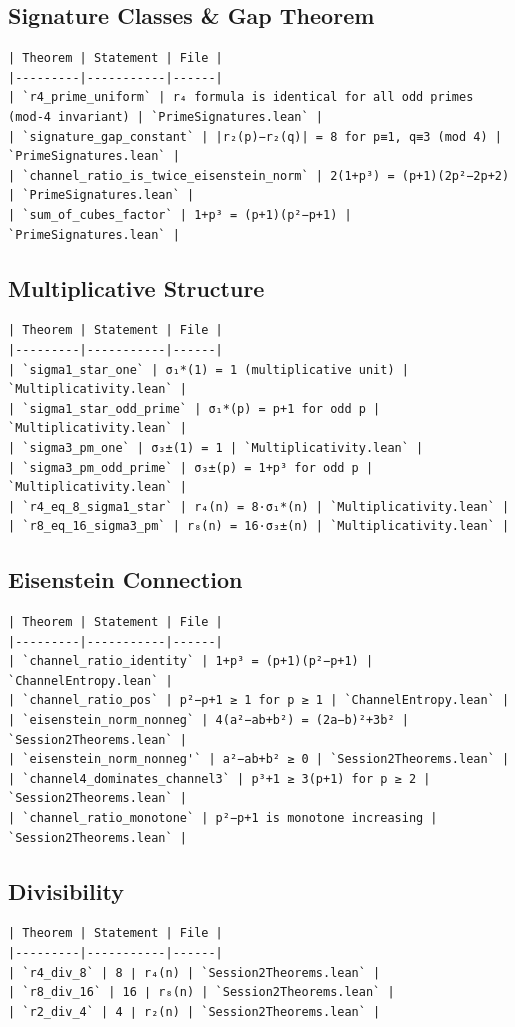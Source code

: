 \documentclass[12pt,a4paper,openany]{book}
\begin{document}
\subsection{Signature Classes \& Gap Theorem}
\begin{verbatim}
| Theorem | Statement | File |
|---------|-----------|------|
| `r4_prime_uniform` | r₄ formula is identical for all odd primes (mod-4 invariant) | `PrimeSignatures.lean` |
| `signature_gap_constant` | |r₂(p)−r₂(q)| = 8 for p≡1, q≡3 (mod 4) | `PrimeSignatures.lean` |
| `channel_ratio_is_twice_eisenstein_norm` | 2(1+p³) = (p+1)(2p²−2p+2) | `PrimeSignatures.lean` |
| `sum_of_cubes_factor` | 1+p³ = (p+1)(p²−p+1) | `PrimeSignatures.lean` |
\end{verbatim}

\subsection{Multiplicative Structure}
\begin{verbatim}
| Theorem | Statement | File |
|---------|-----------|------|
| `sigma1_star_one` | σ₁*(1) = 1 (multiplicative unit) | `Multiplicativity.lean` |
| `sigma1_star_odd_prime` | σ₁*(p) = p+1 for odd p | `Multiplicativity.lean` |
| `sigma3_pm_one` | σ₃±(1) = 1 | `Multiplicativity.lean` |
| `sigma3_pm_odd_prime` | σ₃±(p) = 1+p³ for odd p | `Multiplicativity.lean` |
| `r4_eq_8_sigma1_star` | r₄(n) = 8·σ₁*(n) | `Multiplicativity.lean` |
| `r8_eq_16_sigma3_pm` | r₈(n) = 16·σ₃±(n) | `Multiplicativity.lean` |
\end{verbatim}

\subsection{Eisenstein Connection}
\begin{verbatim}
| Theorem | Statement | File |
|---------|-----------|------|
| `channel_ratio_identity` | 1+p³ = (p+1)(p²−p+1) | `ChannelEntropy.lean` |
| `channel_ratio_pos` | p²−p+1 ≥ 1 for p ≥ 1 | `ChannelEntropy.lean` |
| `eisenstein_norm_nonneg` | 4(a²−ab+b²) = (2a−b)²+3b² | `Session2Theorems.lean` |
| `eisenstein_norm_nonneg'` | a²−ab+b² ≥ 0 | `Session2Theorems.lean` |
| `channel4_dominates_channel3` | p³+1 ≥ 3(p+1) for p ≥ 2 | `Session2Theorems.lean` |
| `channel_ratio_monotone` | p²−p+1 is monotone increasing | `Session2Theorems.lean` |
\end{verbatim}

\subsection{Divisibility}
\begin{verbatim}
| Theorem | Statement | File |
|---------|-----------|------|
| `r4_div_8` | 8 ∣ r₄(n) | `Session2Theorems.lean` |
| `r8_div_16` | 16 ∣ r₈(n) | `Session2Theorems.lean` |
| `r2_div_4` | 4 ∣ r₂(n) | `Session2Theorems.lean` |
\end{verbatim}
\end{document}
